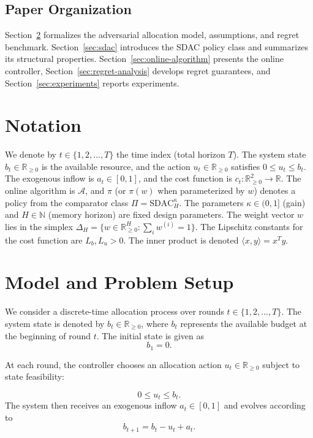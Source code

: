 \documentclass[11pt]{article}
\begin{document}
\subsection{Paper Organization}
Section~\ref{sec:model-setup} formalizes the adversarial allocation model, assumptions, and regret benchmark. Section~\ref{sec:sdac} introduces the SDAC policy class and summarizes its structural properties. Section~\ref{sec:online-algorithm} presents the online controller, Section~\ref{sec:regret-analysis} develops regret guarantees, and Section~\ref{sec:experiments} reports experiments.


\section{Notation}
\label{sec:notation}

We denote by $t\in\{1,2,\ldots,T\}$ the time index (total horizon $T$). The system state $b_t\in\mathbb{R}_{\ge 0}$ is the available resource, and the action $u_t\in\mathbb{R}_{\ge 0}$ satisfies $0 \le u_t \le b_t$. The exogenous inflow is $a_t\in[0,1]$, and the cost function is $c_t:\mathbb{R}_{\ge 0}^2\to\mathbb{R}$. The online algorithm is $\mathcal{A}$, and $\pi$ (or $\pi(w)$ when parameterized by $w$) denotes a policy from the comparator class $\Pi = \mathrm{SDAC}_H^{\kappa}$. The parameters $\kappa\in(0,1]$ (gain) and $H\in\mathbb{N}$ (memory horizon) are fixed design parameters. The weight vector $w$ lies in the simplex $\Delta_H = \{w\in\mathbb{R}_{\ge 0}^H : \sum_i w^{(i)}=1\}$. The Lipschitz constants for the cost function are $L_b,L_u>0$. The inner product is denoted $\langle x,y\rangle = x^T y$.

\section{Model and Problem Setup}
\label{sec:model-setup}

We consider a discrete-time allocation process over rounds $t\in\{1,2,\ldots,T\}$. The system state is denoted by $b_t\in\mathbb{R}_{\ge 0}$, where $b_t$ represents the available budget at the beginning of round $t$. The initial state is given as
\[
b_1 = 0.
\]

At each round, the controller chooses an allocation action $u_t\in\mathbb{R}_{\ge 0}$ subject to state feasibility:

\begin{equation}
\label{eq:model-feasibility}
0 \le u_t \le b_t.
\end{equation}
The system then receives an exogenous inflow $a_t\in[0,1]$ and evolves according to
\begin{equation}
\label{eq:model-dynamics}
b_{t+1} = b_t - u_t + a_t.
\end{equation}
\end{document}
